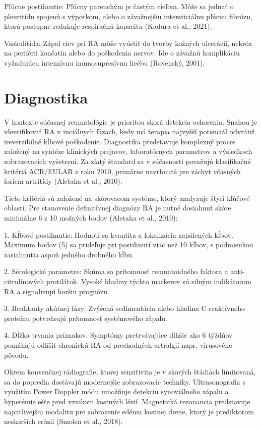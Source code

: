 Pľúcne postihnutie: Pľúcny parenchým je častým cieľom. Môže sa jednať o pleuritídu spojenú s výpotkom, alebo o závažnejšiu intersticiálnu pľúcnu fibrózu, ktorá postupne redukuje respiračnú kapacitu (Kadura et al., 2021). 

Vaskulitída: Zápal ciev pri RA môže vyústiť do tvorby kožných ulcerácií, nekróz na periférii končatín alebo do poškodenia nervov. Ide o závažnú komplikáciu vyžadujúcu intenzívnu imunosupresívnu liečbu (Rovenský, 2001). 

\section{Diagnostika}

V kontexte súčasnej reumatológie je prioritou skorá detekcia ochorenia. Snahou je identifikovať RA v inciálnych fázach, kedy má terapia najvyšší potenciál odvrátiť ireverzibilné kĺbové poškodenie. Diagnostika predstavuje komplexný proces založený na syntéze klinických prejavov, laboratórnych parametrov a výsledkoch zobrazovacích vyšetrení. Za zlatý štandard sa v súčasnosti považujú klasifikačné kritériá ACR/EULAR z roku 2010, primárne navrhnuté pre záchyt včasných foriem artritídy (Aletaha et al., 2010). 

Tieto kritériá sú založené na skórovacom systéme, ktorý analyzuje štyri kľúčové oblasti. Pre stanovenie definitívnej diagnózy RA je nutné dosiahnuť skóre minimálne 6 z 10 možných bodov (Aletaha et al., 2010): 

1. Kĺbové postihnutie: Hodnotí sa kvantita a lokalizácia zapálených kĺbov. Maximum bodov (5) sa prideľuje pri postihnutí viac než 10 kĺbov, s podmienkou zasiahnutia aspoň jedného drobného kĺbu. 

2. Sérologické parametre: Skúma sa prítomnosť reumatoidného faktora a anti-citrulínových protilátok. Vysoké hladiny týchto markerov sú silným indikátorom RA a signalizujú horšiu prognózu. 

3. Reaktanty akútnej fázy: Zvýšená sedimentácia alebo hladina C-reaktívneho proteínu potvrdzujú prítomnosť systémového zápalu. 

4. Dĺžka trvania príznakov: Symptómy pretrvávajúce dlhšie ako 6 týždňov pomáhajú odlíšiť chronickú RA od prechodných artralgií napr. vírusového pôvodu. 

Okrem konvenčnej rádiografie, ktorej senzitivita je v skorých štádiách limitovaná, sa do popredia dostávajú modernejšie zobrazovacie techniky. Ultrasonografia s využitím Power Doppler módu umožňuje detekciu synoviálneho zápalu a hyperémie ešte pred vznikom kostných lézií. Magnetická rezonancia predstavuje najcitlivejšiu modalitu pre zobrazenie edému kostnej drene, ktorý je prediktorom neskorších erózií (Smolen et al., 2018). 

